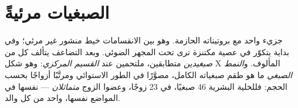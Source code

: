 \section{الصبغيات مرئيةً}

\begin{definition}\label{def:g11:cell-cycle-mitosis:chromosome}
\emph{} جزيء  واحد مع بروتيناته الحازمة. وهو بين الانقسامات
خيط منشور غير مرئي؛ وفي بداية  يتكوّر في عصية مكتنزة
ترى تحت المجهر الضوئي. وبعد التضاعف يتألف كل  من
\emph{صبغيدين} متطابقين، ملتحمين عند \emph{القسيم
المركزي}: وهو شكل X المألوف. و\emph{النمط
الصبغي}  ما هو طقم صبغياته الكامل، مصوَّرًا في
الطور الاستوائي ومرتَّبًا أزواجًا بحسب الحجم: فللخلية البشرية 46
صبغيًا، في 23 زوجًا، وعضوا الزوج \emph{متماثلان} ---  نفسها
في المواضع نفسها، واحد من كل والد.
\end{definition}

